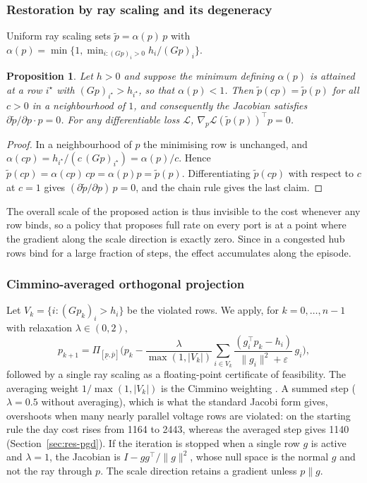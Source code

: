 \documentclass[11pt]{article}
\newtheorem{prop}{Proposition}
\begin{document}
\subsubsection{Restoration by ray scaling and its degeneracy}
Uniform ray scaling sets $\tilde p=\alpha(p)\,p$ with $\alpha(p)=\min\{1,\min_{i:(Gp)_i>0}h_i/(Gp)_i\}$.
\begin{prop}\label{prop:ray}
Let $h>0$ and suppose the minimum defining $\alpha(p)$ is attained at a row $i^\star$ with $(Gp)_{i^\star}>h_{i^\star}$, so that $\alpha(p)<1$. Then $\tilde p(cp)=\tilde p(p)$ for all $c>0$ in a neighbourhood of $1$, and consequently the Jacobian satisfies $\partial\tilde p/\partial p\cdot p=0$. For any differentiable loss $\mathcal L$, $\nabla_p\mathcal L(\tilde p(p))^\top p=0$.
\end{prop}
\begin{proof}
In a neighbourhood of $p$ the minimising row is unchanged, and $\alpha(cp)=h_{i^\star}/(c\,(Gp)_{i^\star})=\alpha(p)/c$. Hence $\tilde p(cp)=\alpha(cp)\,cp=\alpha(p)p=\tilde p(p)$. Differentiating $\tilde p(cp)$ with respect to $c$ at $c=1$ gives $(\partial\tilde p/\partial p)\,p=0$, and the chain rule gives the last claim.
\end{proof}
The overall scale of the proposed action is thus invisible to the cost whenever any row binds, so a policy that proposes full rate on every port is at a point where the gradient along the scale direction is exactly zero. Since in a congested hub rows bind for a large fraction of steps, the effect accumulates along the episode.

\subsubsection{Cimmino-averaged orthogonal projection}
Let $V_k=\{i:(Gp_k)_i>h_i\}$ be the violated rows. We apply, for $k=0,\dots,n-1$ with relaxation $\lambda\in(0,2)$,
\begin{equation}
p_{k+1}=\Pi_{[\underline p,\bar p]}\Big(p_k-\frac{\lambda}{\max(1,|V_k|)}\sum_{i\in V_k}\frac{(g_i^\top p_k-h_i)}{\|g_i\|^2+\varepsilon}\,g_i\Big),
\end{equation}
followed by a single ray scaling as a floating-point certificate of feasibility. The averaging weight $1/\max(1,|V_k|)$ is the Cimmino weighting \cite{cimmino,censor}. A summed step ($\lambda=0.5$ without averaging), which is what the standard Jacobi form gives, overshoots when many nearly parallel voltage rows are violated: on the starting rule the day cost rises from 1164 to 2443, whereas the averaged step gives 1140 (Section~\ref{sec:res-pgd}). If the iteration is stopped when a single row $g$ is active and $\lambda=1$, the Jacobian is $I-gg^\top/\|g\|^2$, whose null space is the normal $g$ and not the ray through $p$. The scale direction retains a gradient unless $p\parallel g$.
\end{document}

